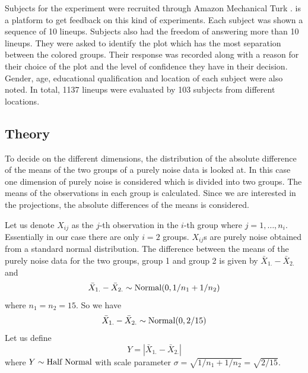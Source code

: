 
Subjects  for the experiment were recruited through Amazon Mechanical Turk  \citep{turk}.  \cite{turk} is a platform to get feedback on this kind of experiments. Each subject was shown a sequence of 10 lineups. Subjects also had the freedom of answering more than 10 lineups. They were asked to identify the plot which has the most separation between the colored groups. Their response was recorded along with a reason for their choice of the plot and the level of confidence they have in their decision.  Gender, age, educational qualification and location of each subject were also noted. In total, 1137 lineups were evaluated by 103 subjects from different locations.





\subsection{Theory} \label{sec:theory}

To decide on the different dimensions, the distribution of the absolute difference of the means of the two groups of a purely noise data is looked at. In this case one dimension of purely noise is considered which is divided into two groups. The means of the observations in each group is calculated. Since we are interested in the projections, the absolute differences of the means is considered.

Let us denote $X_{ij}$ as the $j$-th observation in the $i$-th group where $j = 1, \dots, n_i$. Essentially in our case there are only $i = 2$ groups. $X_{ij}$s are purely noise obtained from a standard normal distribution. The difference between the means of the purely noise data for the two groups, group 1 and group 2 is given by $\bar{X}_{1.} - \bar{X}_{2.}$ and $$\bar{X}_{1.} - \bar{X}_{2.} \sim \hbox{Normal}(0, 1/n_1 + 1/n_2)$$ where $n_1 = n_2 = 15$. So we have $$\bar{X}_{1.} - \bar{X}_{2.} \sim \hbox{Normal}(0, 2/15)$$ Let us define $$Y  = |\bar{X}_{1.} - \bar{X}_{2.}|$$ where $Y \sim \hbox{Half Normal}$ with scale parameter $ \sigma = \sqrt{1/n_1 + 1/n_2} = \sqrt{2/15}$. \\

